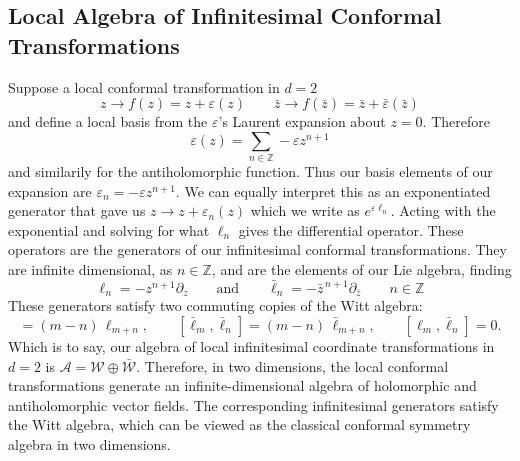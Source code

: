 \documentclass{article}
\begin{document}
\subsection{Local Algebra of Infinitesimal Conformal Transformations}
Suppose a local conformal transformation in $d = 2$
\begin{equation}
    z \longrightarrow f(z) = z + \varepsilon(z) \qquad \bar{z} \longrightarrow f(\bar{z}) = \bar{z} + \bar{\varepsilon}(\bar{z})
\end{equation}
and define a local basis from the $\varepsilon$'s Laurent expansion about $z=0$. Therefore 
\begin{equation}
\varepsilon(z) = \sum_{n\in\mathbb{Z}} -\varepsilon z^{n+1}
\end{equation}
and similarily for the antiholomorphic function. Thus our basis elements of our expansion are $\varepsilon_n = -\varepsilon z^{n+1}$. We can equally interpret this as an exponentiated generator that gave us $z \longrightarrow z+ \varepsilon_n(z)$ which we write as $e^{\varepsilon\ell_n}$. Acting with the exponential and solving for what $\ell_n$ gives the differential operator. These operators are the generators of our infinitesimal conformal transformations. They are infinite dimensional, as $n \in \mathds{Z}$, and are the elements of our Lie algebra, finding
\begin{equation}
\ell_n = -z^{n+1}\partial_z
\qquad \text{and} \qquad
\bar{\ell}_n = -\bar{z}^{\,n+1}\partial_{\bar{z}}
\qquad n \in \mathbb{Z}
\end{equation}
These generators satisfy two commuting copies of the Witt algebra:
\begin{equation}
[\ell_m,\ell_n] = (m-n)\,\ell_{m+n}, 
\qquad
[\bar{\ell}_m,\bar{\ell}_n] = (m-n)\,\bar{\ell}_{m+n},
\qquad
[\ell_m,\bar{\ell}_n] = 0.
\end{equation}
Which is to say, our algebra of local infinitesimal coordinate transformations in $d=2$ is $\mathcal{A} = \mathcal{W} \oplus \bar{\mathcal{W}}$. Therefore, in two dimensions, the local conformal transformations generate an infinite-dimensional algebra of holomorphic and antiholomorphic vector fields. The corresponding infinitesimal generators satisfy the Witt algebra,
which can be viewed as the classical conformal symmetry algebra in two dimensions.
\end{document}
